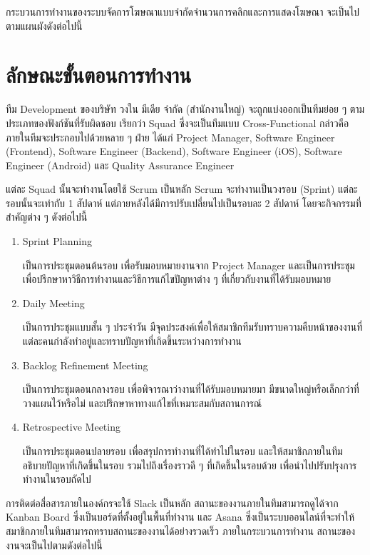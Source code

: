 กระบวนการทำงานของระบบจัดการโฆษณาแบบจำกัดจำนวนการคลิกและการแสดงโฆษณา จะเป็นไปตามแผนผังดังต่อไปนี้

\section{ลักษณะขั้นตอนการทำงาน}
ทีม Development ของบริษัท วงใน มีเดีย จำกัด (สำนักงานใหญ่) จะถูกแบ่งออกเป็นทีมย่อย ๆ ตามประเภทของฟังก์ชันที่รับผิดชอบ เรียกว่า Squad ซึ่งจะเป็นทีมแบบ Cross-Functional กล่าวคือ ภายในทีมจะประกอบไปด้วยหลาย ๆ ฝ่าย ได้แก่ Project Manager, Software Engineer (Frontend), Software Engineer (Backend), Software Engineer (iOS), Software Engineer (Android) และ Quality Assurance Engineer

แต่ละ Squad นั้นจะทำงานโดยใช้ Scrum เป็นหลัก Scrum จะทำงานเป็นวงรอบ (Sprint) แต่ละรอบนั้นจะเท่ากับ 1 สัปดาห์ แต่ภายหลังได้มีการปรับเปลี่ยนไปเป็นรอบละ 2 สัปดาห์ โดยจะกิจกรรมที่สำคัญต่าง ๆ ดังต่อไปนี้
\begin{enumerate}
	\item Sprint Planning
	
	เป็นการประชุมตอนต้นรอบ เพื่อรับมอบหมายงานจาก Project Manager และเป็นการประชุมเพื่อปรึกษาหาวิธีการทำงานและวิธีการแก้ไขปัญหาต่าง ๆ ที่เกี่ยวกับงานที่ได้รับมอบหมาย
	
	\item Daily Meeting
	
	เป็นการประชุมแบบสั้น ๆ ประจำวัน มีจุดประสงค์เพื่อให้สมาชิกทีมรับทราบความคืบหน้าของงานที่แต่ละคนกำลังทำอยู่และทราบปัญหาที่เกิดขึ้นระหว่างการทำงาน
	
	\item Backlog Refinement Meeting
	
	เป็นการประชุมตอนกลางรอบ เพื่อพิจารณาว่างานที่ได้รับมอบหมายมา มีขนาดใหญ่หรือเล็กกว่าที่วางแผนไว้หรือไม่ และปรึกษาหาทางแก้ไขที่เหมาะสมกับสถานการณ์
	
	\item Retrospective Meeting
	
	เป็นการประชุมตอนปลายรอบ เพื่อสรุปการทำงานที่ได้ทำไปในรอบ และให้สมาชิกภายในทีมอธิบายปัญหาที่เกิดขึ้นในรอบ รวมไปถึงเรื่องราวดี ๆ ที่เกิดขึ้นในรอบด้วย เพื่อนำไปปรับปรุงการทำงานในรอบถัดไป
\end{enumerate}

การติดต่อสื่อสารภายในองค์กรจะใช้ Slack เป็นหลัก สถานะของงานภายในทีมสามารถดูได้จาก Kanban Board ซึ่งเป็นบอร์ดที่ตั้งอยู่ในพื้นที่ทำงาน และ Asana ซึ่งเป็นระบบออนไลน์ที่จะทำให้สมาชิกภายในทีมสามารถทราบสถานะของงานได้อย่างรวดเร็ว ภายในกระบวนการทำงาน สถานะของงานจะเป็นไปตามดังต่อไปนี้

